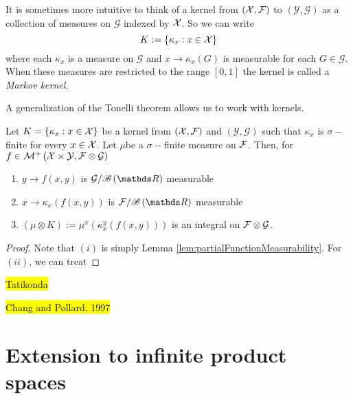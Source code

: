 \begin{rem*}
It is sometimes more intuitive to think of a kernel from $\left(\mathcal{X},\mathcal{F}\right)$
to $\left(\mathcal{Y},\mathcal{G}\right)$ as a collection of measures
on $\mathcal{G}$ indexed by $\mathcal{X}$. So we can write
\[
K:=\left\{ \kappa_{x}:x\in\mathcal{X}\right\} 
\]
where each $\kappa_{x}$ is a measure on $\mathcal{G}$ and $x\to\kappa_{x}\left(G\right)$
is measurable for each $G\in\mathcal{G}$. When these measures are
restricted to the range $\left[0,1\right]$ the kernel is called a
\emph{Markov kernel.}
\end{rem*}
A generalization of the Tonelli theorem allows us to work with kernels.
\begin{thm}
\label{thm:tonelliKernels}Let $K=\left\{ \kappa_{x}:x\in\mathcal{X}\right\} $
be a kernel from $\left(\mathcal{X},\mathcal{F}\right)$ and $\left(\mathcal{Y},\mathcal{G}\right)$
such that $\kappa_{x}$ is $\sigma-$finite for every $x\in\mathcal{X}$. Let
$\mu$be a $\sigma-$finite measure on $\mathcal{F}$. Then, for $f\in\mathcal{M}^{+}\left(\mathcal{X}\times\mathcal{Y},\mathcal{F}\otimes\mathcal{G}\right)$

\begin{enumerate}[label=(\roman*),leftmargin=.1\linewidth,rightmargin=.4\linewidth]
\item $y \to f\left(x,y\right)$ is $\mathcal{G}/\borel\left(\R\right)$ measurable
\item $x \to \kappa_x\left(f\left(x,y\right)\right)$ is $\mathcal{F}/\borel\left(\R\right)$ measurable
\item $\left(\mu \otimes K\right) := \mu^x\left(\kappa_x^y\left(f\left(x,y\right)\right)\right)$ is an integral on $\mathcal{F}\otimes\mathcal{G}$.
\end{enumerate}
\end{thm}

\begin{proof}
Note that $(i)$ is simply Lemma \ref{lem:partialFunctionMeasurability}.
For $\left(ii\right)$, we can treat
\end{proof}
\hl{Tatikonda}

\hl{Chang and Pollard, 1997}

\section{Extension to infinite product spaces}


